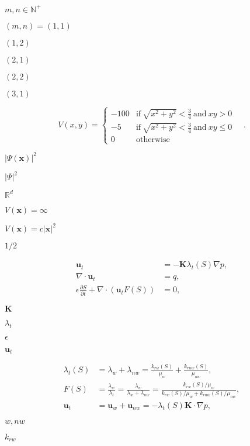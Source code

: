 \documentclass{article}
\begin{document}
$m,n\in{\mathbb N^+}$
\pagebreak

$(m,n)=(1,1)$
\pagebreak

$(1,2)$
\pagebreak

$(2,1)$
\pagebreak

$(2,2)$
\pagebreak

$(3,1)$
\pagebreak

\[ V(x,y) = \left\{ \begin{array}{ll} -100 & \text{if}\ \sqrt{x^2+y^2}<\frac 34 \ \text{and} \ xy>0 \\ -5 & \text{if}\ \sqrt{x^2+y^2}<\frac 34 \ \text{and} \ xy\le 0 \\ 0 & \text{otherwise} \end{array} \right.\quad. \]
\pagebreak

$|\Psi(\mathbf x)|^2$
\pagebreak

$|\Psi|^2$
\pagebreak

${\mathbb R}^d$
\pagebreak

$V(\mathbf x)=\infty$
\pagebreak

$V(\mathbf x)=c|\mathbf x|^2$
\pagebreak

$1/2$
\pagebreak

\begin{align*} \mathbf{u}_t &= - \mathbf{K} \lambda_t \left(S\right) \nabla p, \\ \nabla \cdot \mathbf{u}_t &= q, \\ \epsilon \frac{\partial S}{\partial t} + \nabla \cdot \left( \mathbf{u}_t F\left( S \right) \right)&=0, \end{align*}
\pagebreak

$\mathbf{K}$
\pagebreak

$\lambda_t$
\pagebreak

$\epsilon$
\pagebreak

$\mathbf{u}_t$
\pagebreak

\begin{align*} \lambda_t(S)&= \lambda_w + \lambda_{nw} = \frac{k_{rw}(S)}{\mu_w} + \frac{k_{rnw}(S)}{\mu_{nw}}, \\ F(S) &= \frac{\lambda_w}{\lambda_t} = \frac{\lambda_w}{\lambda_w + \lambda_{nw}} = \frac{k_{rw}(S)/\mu_w}{k_{rw}(S)/\mu_w + k_{rnw}(S)/\mu_{nw}}, \\ \mathbf{u}_t &= \mathbf{u}_w + \mathbf{u}_{nw} = -\lambda_t(S)\mathbf{K} \cdot \nabla p, \end{align*}
\pagebreak

$w, nw$
\pagebreak

$k_{rw}$
\pagebreak
\end{document}
